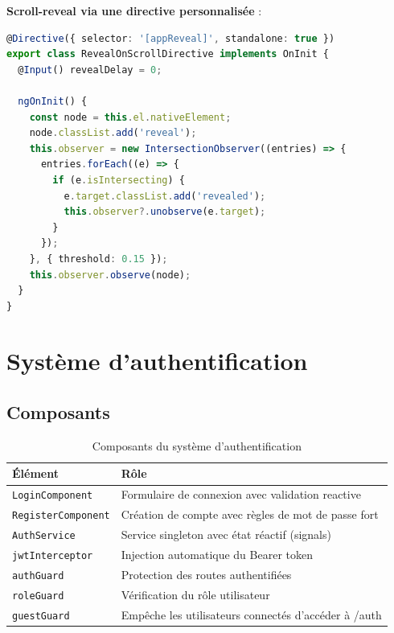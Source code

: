 \documentclass[11pt,a4paper]{article}
\begin{document}
\begin{featurebox}
\textbf{Scroll-reveal via une directive personnalisée} :
\begin{lstlisting}[language=TypeScript]
@Directive({ selector: '[appReveal]', standalone: true })
export class RevealOnScrollDirective implements OnInit {
  @Input() revealDelay = 0;

  ngOnInit() {
    const node = this.el.nativeElement;
    node.classList.add('reveal');
    this.observer = new IntersectionObserver((entries) => {
      entries.forEach((e) => {
        if (e.isIntersecting) {
          e.target.classList.add('revealed');
          this.observer?.unobserve(e.target);
        }
      });
    }, { threshold: 0.15 });
    this.observer.observe(node);
  }
}
\end{lstlisting}
\end{featurebox}

\newpage

\section{Système d'authentification}

\subsection{Composants}

\begin{table}[H]
\centering
\renewcommand{\arraystretch}{1.4}
\begin{tabularx}{\textwidth}{lX}
\toprule
\rowcolor{primary!10}
\textbf{Élément} & \textbf{Rôle} \\
\midrule
\texttt{LoginComponent} & Formulaire de connexion avec validation reactive \\
\texttt{RegisterComponent} & Création de compte avec règles de mot de passe fort \\
\texttt{AuthService} & Service singleton avec état réactif (signals) \\
\texttt{jwtInterceptor} & Injection automatique du Bearer token \\
\texttt{authGuard} & Protection des routes authentifiées \\
\texttt{roleGuard} & Vérification du rôle utilisateur \\
\texttt{guestGuard} & Empêche les utilisateurs connectés d'accéder à /auth \\
\bottomrule
\end{tabularx}
\caption{Composants du système d'authentification}
\end{table}
\end{document}
